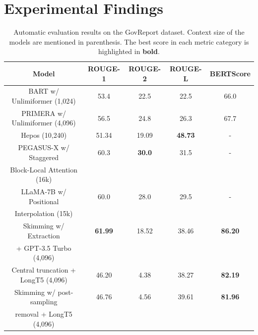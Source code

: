 \section{Experimental Findings}
\label{sec:findings}

\begin{table}[!ht]
	\centering

	\begin{tabular}{c c c c c}
		\hline
		Model & ROUGE-1 & ROUGE-2 & ROUGE-L & BERTScore \\
		\hline
		BART w/ Unlimiformer (1,024) & 53.4 & 22.5 & 22.5 & 66.0 \\
		PRIMERA w/ Unlimiformer (4,096) & 56.5 & 24.8 & 26.3 & 67.7 \\
		Hepos (10,240) & 51.34 & 19.09 & \textbf{48.73} & - \\
		PEGASUS-X w/ Staggered & 60.3 & \textbf{30.0} & 31.5 & - \\
		Block-Local Attention (16k) & & & & \\
		LLaMA-7B w/ Positional & 60.0 & 28.0 & 29.5 & - \\
		Interpolation (15k) & & & & \\
		\hline
		Skimming w/ Extraction & \textbf{61.99} & 18.52 & 38.46 & \textbf{86.20} \\
		+ GPT-3.5 Turbo (4,096) & & & & \\
		Central truncation + LongT5 (4,096) & 46.20 & 4.38 & 38.27 & \textbf{82.19} \\
		Skimming w/ post-sampling & 46.76 & 4.56 & 39.61 & \textbf{81.96} \\
		removal + LongT5 (4,096) & & & & \\
		\hline
	\end{tabular}

	\caption{Automatic evaluation results on the GovReport dataset. Context size of the models are
	mentioned in parenthesis. The best score in each metric category is highlighted in \textbf{bold}.}
	\label{tab:govreport}
\end{table}

